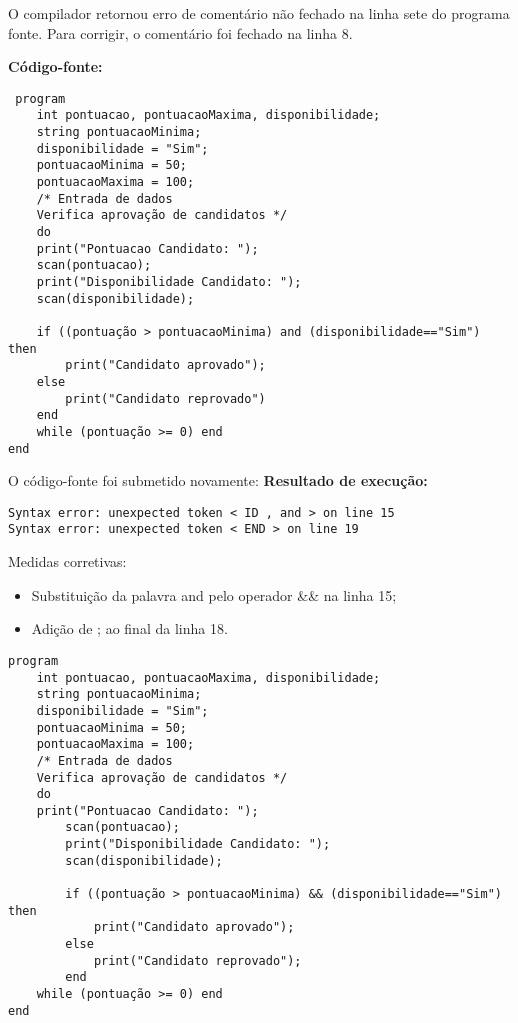 O compilador retornou erro de comentário não fechado na linha sete do programa fonte. Para corrigir, o comentário foi fechado na linha 8.

        \textbf{Código-fonte:}
        
        \begin{lstlisting}
 program
	int pontuacao, pontuacaoMaxima, disponibilidade;
	string pontuacaoMinima;
	disponibilidade = "Sim";
	pontuacaoMinima = 50;
	pontuacaoMaxima = 100;
	/* Entrada de dados
	Verifica aprovação de candidatos */
	do
	print("Pontuacao Candidato: ");
	scan(pontuacao);
	print("Disponibilidade Candidato: ");
	scan(disponibilidade);

	if ((pontuação > pontuacaoMinima) and (disponibilidade=="Sim") then
		print("Candidato aprovado");
	else
		print("Candidato reprovado")
	end
	while (pontuação >= 0) end
end
        \end{lstlisting}
        
O código-fonte foi submetido novamente:
\textbf{Resultado de execução:}

\begin{lstlisting}
Syntax error: unexpected token < ID , and > on line 15
Syntax error: unexpected token < END > on line 19
\end{lstlisting}

Medidas corretivas:

\begin{itemize}
	\item Substituição da palavra and pelo operador \&\& na linha 15;
	
	\item Adição de ; ao final da linha 18.

\end{itemize}

\newpage

\textbf{}
\begin{lstlisting}
program
	int pontuacao, pontuacaoMaxima, disponibilidade;
	string pontuacaoMinima;
	disponibilidade = "Sim";
	pontuacaoMinima = 50;
	pontuacaoMaxima = 100;
	/* Entrada de dados
	Verifica aprovação de candidatos */
	do
	print("Pontuacao Candidato: ");
		scan(pontuacao);
		print("Disponibilidade Candidato: ");
		scan(disponibilidade);

		if ((pontuação > pontuacaoMinima) && (disponibilidade=="Sim") then
			print("Candidato aprovado");
		else
			print("Candidato reprovado");
		end
	while (pontuação >= 0) end
end
\end{lstlisting}

